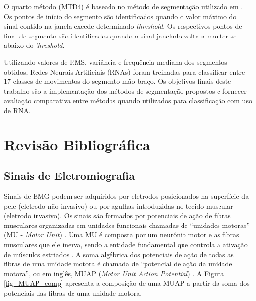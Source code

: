 O quarto método (MTD4) é baseado no método de segmentação utilizado em . Os pontos de início do segmento são identificados quando o valor máximo do sinal contido na janela excede determinado \emph{threshold}. Os respectivos pontos de final de segmento são identificados quando o sinal janelado volta a manter-se abaixo do \emph{threshold}.

Utilizando valores de RMS, variância e frequência mediana dos segmentos obtidos, Redes Neurais Artificiais (RNAs) foram treinadas para classificar entre 17 classes de movimentos do segmento mão-braço. Os objetivos finais deste trabalho são a implementação dos métodos de segmentação propostos e fornecer avaliação comparativa entre métodos quando utilizados para classificação com uso de RNA.

	\chapter{Revisão Bibliográfica}
		\section{Sinais de Eletromiografia}
Sinais de EMG podem ser adquiridos por eletrodos posicionados na superfície da pele (eletrodo não invasivo) ou por agulhas introduzidas no tecido muscular (eletrodo invasivo). Os sinais são formados por potenciais de ação de fibras musculares organizadas em unidades funcionais chamadas de ``unidades motoras'' (MU - \emph{Motor Unit}) \cite{Luca2006}. Uma MU é composta por um neurônio motor e as fibras musculares que ele inerva, sendo a entidade fundamental que controla a ativação de músculos estriados \cite{Buchthal980}. A soma algébrica dos potenciais de ação de todas as fibras de uma unidade motora é chamada de ``potencial de ação da unidade motora'', ou em inglês, MUAP (\emph{Motor Unit Action Potential}) \cite{Almeida1997}. A Figura \ref{fig_MUAP_comp} apresenta a composição de uma MUAP a partir da soma dos potenciais das fibras de uma unidade motora.

